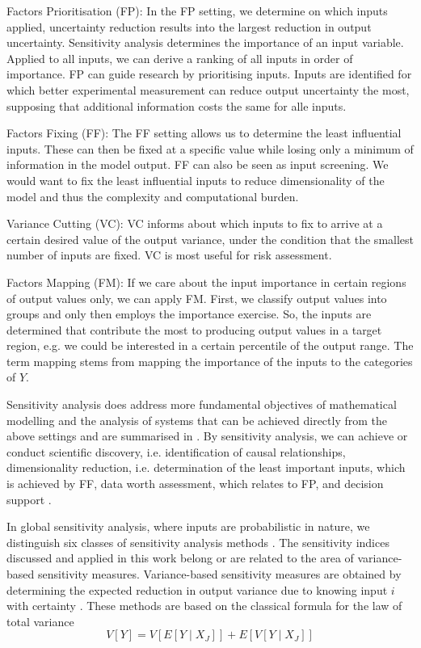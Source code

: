 Factors Prioritisation (FP): In the FP setting, we determine on which inputs applied, uncertainty reduction results into the largest reduction in output uncertainty. Sensitivity analysis determines the importance of an input variable. Applied to all inputs, we can derive a ranking of all inputs in order of importance. FP can guide research by prioritising inputs. Inputs are identified for which better experimental measurement can reduce output uncertainty the most, supposing that additional information costs the same for alle inputs.

Factors Fixing (FF): The FF setting allows us to determine the least influential inputs. These can then be fixed at a specific value while losing only a minimum of information in the model output. FF can also be seen as input screening. We would want to fix the least influential inputs to reduce dimensionality of the model and thus the complexity and computational burden.

Variance Cutting (VC): VC informs about which inputs to fix to arrive at a certain desired value of the output variance, under the condition that the smallest number of inputs are fixed. VC is most useful for risk assessment.

Factors Mapping (FM): If we care about the input importance in certain regions of output values only, we can apply FM. First, we classify output values into groups and only then employs the importance exercise. So, the inputs are determined that contribute the most to producing output values in a target region, e.g. we could be interested in a certain percentile of the output range. The term mapping stems from mapping the importance of the inputs to the categories of $Y$.

Sensitivity analysis does address more fundamental objectives of mathematical modelling and the analysis of systems that can be achieved directly from the above settings and are summarised in \citet{R21}. By sensitivity analysis, we can achieve or conduct scientific discovery, i.e. identification of causal relationships, dimensionality reduction, i.e. determination of the least important inputs, which is achieved by FF, data worth assessment, which relates to FP, and decision support \citep{R21}.

In global sensitivity analysis, where inputs are probabilistic in nature, we distinguish six classes of sensitivity analysis methods \citep{BP16}. The sensitivity indices discussed and applied in this work belong or are related to the area of variance-based sensitivity measures. Variance-based sensitivity measures are obtained by determining the expected reduction in output variance due to knowing input $i$ with certainty \citep{BP16}. These methods are based on the classical formula for the law of total variance
\begin{equation*}
V[Y]= V[E[Y \mid X_J]] + E[V[Y \mid X_J]]
\end{equation*}

